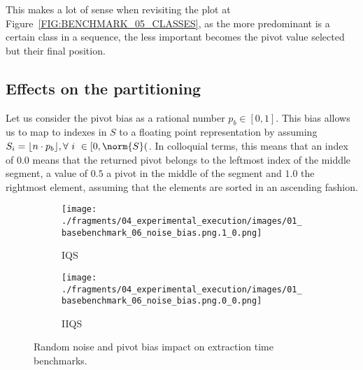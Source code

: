 This makes a lot of sense when revisiting the plot at Figure~\ref{FIG:BENCHMARK_05_CLASSES}, as the more predominant is a certain class in a sequence, the less important becomes the pivot value selected but their final position.\\

\subsection{Effects on the partitioning}

Let us consider the pivot bias as a rational number $p_b \in [0,1]$. This bias allows us to map to indexes in $S$ to a floating point representation by assuming $S_i = \lfloor n\cdot p_{b}  \rfloor, \forall ~i~ \in[0,\norm{S}($. In colloquial terms, this means that an index of $0.0$ means that the returned pivot belongs to the leftmost index of the middle segment, a value of $0.5$ a pivot in the middle of the segment and $1.0$ the rightmost element, assuming that the elements are sorted in an ascending fashion.\\

\begin{figure}
    \centering
    \begin{subfigure}[b]{0.45\textwidth}
        \centering
        \texttt{[image: ./fragments/04\_experimental\_execution/images/01\_basebenchmark\_06\_noise\_bias.png.1\_0.png]}
        \caption{IQS}
        \label{FIG:BENCHMARK_06_NOISE_BIAS__0_0}
    \end{subfigure}
    \hfill
    \begin{subfigure}[b]{0.45\textwidth}
        \centering
        \texttt{[image: ./fragments/04\_experimental\_execution/images/01\_basebenchmark\_06\_noise\_bias.png.0\_0.png]}
        \caption{IIQS}
        \label{FIG:BENCHMARK_06_NOISE_BIAS__0_1}
    \end{subfigure}

    \caption{Random noise and pivot bias impact on extraction time benchmarks.}
    \label{FIG:BENCHMARK_06_NOISE_BIAS}
\end{figure}

